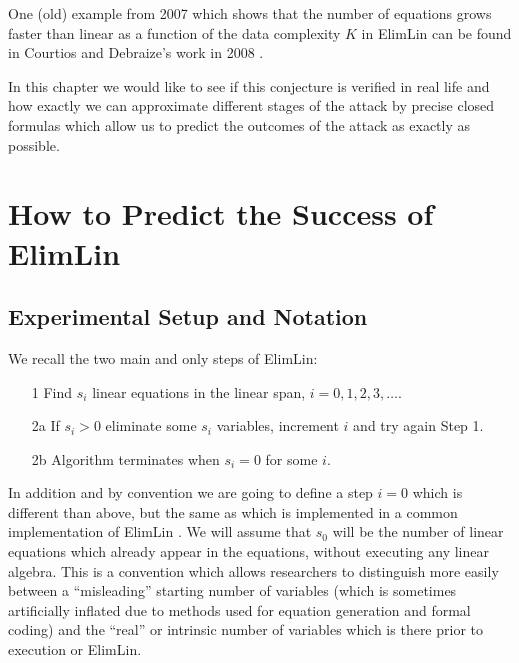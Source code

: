 \noindent
One (old) example from 2007 which shows that the number of equations grows faster than linear
as a function of the data complexity $K$ in ElimLin can be found in Courtios and Debraize's work in 2008 \cite{ToyRijSer}. 

In this chapter we would like to see if this conjecture is verified in real life and how exactly we can approximate different stages of the attack by precise closed formulas which allow us to predict the outcomes of the attack as exactly as possible. 





\section{How to Predict the Success of ElimLin}

\subsection{Experimental Setup and Notation}
\label{ElimLinSetup}
\label{ElimLinNotation}

We recall the two main and only steps of ElimLin:

\begin{enumerate}
	\item[1] Find $s_i$ linear equations in the linear span, $i=0,1,2,3,\ldots$.
	\item[2a] If $s_i>0$ eliminate some $s_i$ variables,
	increment $i$ and try again Step 1.
	\item[2b] Algorithm terminates when $s_i=0$ for some $i$.
\end{enumerate}

In addition and by convention we are going to define a step $i=0$ which is different than
above, but the same as which is implemented in a common implementation of ElimLin \cite{CourtoisSoftware}.
We will assume that $s_0$ will be the number of linear equations which already appear in the equations,
without executing any linear algebra. This is a convention which allows researchers to distinguish
more easily between a ``misleading'' starting number of variables (which is sometimes artificially inflated due to
methods used for equation generation and formal coding)
and the ``real'' or intrinsic number of variables which is there prior to execution or ElimLin.

